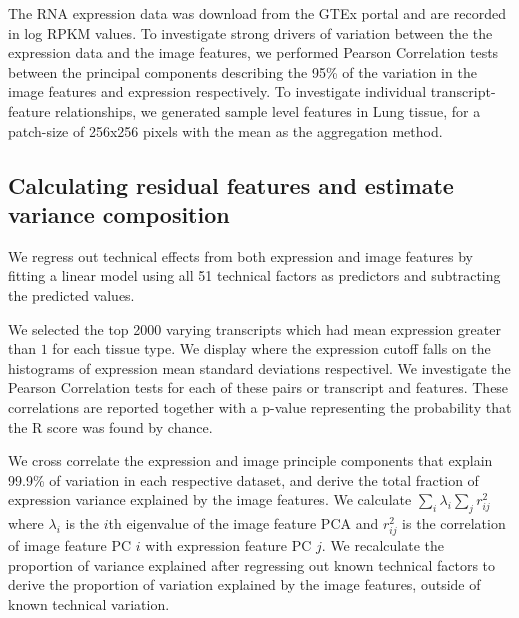 \documentclass{article}
\newcommand*{\figuretitle}[1]{%
    {\centering%
    \textbf{#1}%
    \par\medskip}%
}
\begin{document}
The RNA expression data was download from the GTEx portal and are recorded in log RPKM values. To investigate strong drivers of variation between the the expression data and the image features, we performed Pearson Correlation tests between the principal components describing the 95\% of the variation in the image features and expression respectively. To investigate individual transcript-feature relationships, we generated sample level features in Lung tissue, for a patch-size of 256x256 pixels with the mean as the aggregation method.



\subsection{Calculating residual features and estimate variance composition}
We regress out technical effects from both expression and image features by fitting a linear model using all 51 technical factors as predictors and subtracting the predicted values.

We selected the top 2000 varying transcripts which had mean expression greater than $1$ for each tissue type. We display where the expression cutoff falls on the histograms of expression mean standard deviations respectivel. We investigate the Pearson Correlation tests for each of these pairs or transcript and features. These correlations are reported together with a p-value representing the probability that the R score was found by chance.

We cross correlate the expression and image principle components that explain 99.9\% of variation in each respective dataset, and derive the total fraction of expression variance explained by the image features. We calculate $\sum_i \lambda_i \sum_j r^2_{ij} $ where $\lambda_i$ is the $i$th eigenvalue of the image feature PCA and $r^2_{ij}$ is the correlation of image feature PC $i$ with expression feature PC $j$. We recalculate the proportion of variance explained after regressing out known technical factors to derive the proportion of variation explained by the image features, outside of known technical variation.
\end{document}
